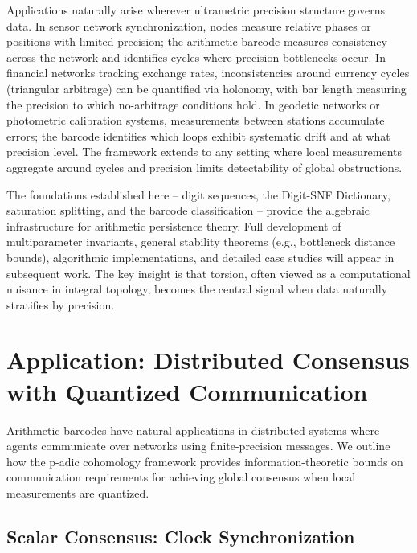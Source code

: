 \documentclass[11pt]{amsart}
\theoremstyle{plain}
\theoremstyle{definition}
\begin{document}
Applications naturally arise wherever ultrametric precision structure governs data. In sensor network synchronization, nodes measure relative phases or positions with limited precision; the arithmetic barcode measures consistency across the network and identifies cycles where precision bottlenecks occur. In financial networks tracking exchange rates, inconsistencies around currency cycles (triangular arbitrage) can be quantified via holonomy, with bar length measuring the precision to which no-arbitrage conditions hold. In geodetic networks or photometric calibration systems, measurements between stations accumulate errors; the barcode identifies which loops exhibit systematic drift and at what precision level. The framework extends to any setting where local measurements aggregate around cycles and precision limits detectability of global obstructions.

The foundations established here -- digit sequences, the Digit-SNF Dictionary, saturation splitting, and the barcode classification -- provide the algebraic infrastructure for arithmetic persistence theory. Full development of multiparameter invariants, general stability theorems (e.g., bottleneck distance bounds), algorithmic implementations, and detailed case studies will appear in subsequent work. The key insight is that torsion, often viewed as a computational nuisance in integral topology, becomes the central signal when data naturally stratifies by precision.


\section{Application: Distributed Consensus with Quantized Communication}
\label{sec:application}

Arithmetic barcodes have natural applications in distributed systems where agents communicate over networks using finite-precision messages. We outline how the p-adic cohomology framework provides information-theoretic bounds on communication requirements for achieving global consensus when local measurements are quantized.

\subsection{Scalar Consensus: Clock Synchronization}
\label{ssec:scalar-consensus}
\end{document}
